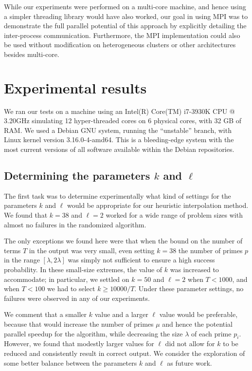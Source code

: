 \documentclass[letterpaper,10pt]{article}
\begin{document}
 While our experiments were performed on a multi-core machine, and hence
 using a simpler threading library would have also worked, our goal in
 using MPI was to demonstrate the full parallel potential of this
 approach by explicitly detailing the inter-process communication.
 Furthermore, the MPI implementation could also be used without
 modification on heterogeneous clusters or other architectures besides
 multi-core.
  
\section{Experimental results}
\label{sec:exper}

We ran our tests on a machine using an Intel(R) Core(TM) i7-3930K CPU @ 3.20GHz 
simulating 12 hyper-threaded cores on 6 physical cores, with 32 GB of RAM. 
We used a Debian GNU system, running the ``unstable'' branch, 
with Linux kernel version 3.16.0-4-amd64. This is a bleeding-edge system
with the most current versions of all software available within the
Debian repositories.

\subsection{Determining the parameters $k$ and $\ell$}

The first task was to determine experimentally what kind of settings for
the parameters $k$ and $\ell$ would be appropriate for our heuristic
interpolation method. We found that $k=38$ and $\ell=2$ worked for a
wide range of problem sizes with almost no failures in the randomized
algorithm.

The only exceptions we found here were that when the bound on the number of
terms $T$ in the output was very small, even setting $k=38$ the number
of primes $p$ in the range $[\lambda,2\lambda]$ was simply not
sufficient to ensure a high success probability. In these small-size
extremes, the value of $k$ was increased to accommodate; in particular, 
we settled on $k=50$ and
$\ell=2$ when $T < 1000$, and when $T < 100$ we had to select 
$k \ge 10000/T$. Under these parameter settings, no failures were
observed in any of our experiments.

We comment that a smaller $k$ value and a
larger $\ell$ value would be preferable, because that 
would increase the number of primes $\mu$ and
hence the potential parallel speedup
for the algorithm, while decreasing the size $\lambda$ of each prime
$p_i$. However, we found that modestly larger values for $\ell$ did not
allow for $k$ to be reduced and consistently result in correct output.
We consider the exploration of some better balance between the
parameters $k$ and $\ell$ as future work.
\end{document}
